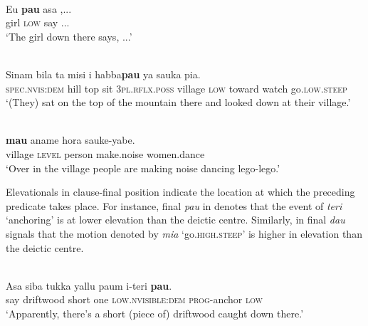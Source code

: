 \ea%
\label{ex:7:33}
 \\
\gll   Eu  \textbf{pau} asa{\ng} ,...\\
   girl  \textsc{low} say ... \\
\glt   `The girl down there says, ...' 
\z









\ea%
\label{ex:7:34}
 \\
\gll  Sinam   bila    ta{\ng}    misi{\ng}  i  habba{\ng}\textbf{pau}   ya     sauka{\ng}  pia. \\
    \textsc{spec.nvis:dem} hill  top  sit  \textsc{3pl.rflx.poss} village  \textsc{low}   toward  watch  go\textsc{.low.steep} \\
\glt   `(They) sat on the top of the mountain there and looked down at their village.'
\z

\ea%
\label{ex:7:35}
 \\
 \textbf{mau} {aname  hora{\ng}}  sauke-yabe.\\
  village  \textsc{level} person  make.noise  women.dance \\
\glt  `Over in the village people are making noise dancing lego-lego.' 
\z


Elevationals in clause-final position indicate the location at which the preceding predicate takes place. For instance, final \textit{pau} in  denotes that the event of \textit{teri} `anchoring' is at lower elevation than the deictic centre. Similarly, in  final \textit{dau} signals that the motion denoted by \textit{mia} `go.\textsc{high.steep}' is higher in elevation than the deictic centre. 



\ea%
\label{ex:7:36}
 \\
\gll  Asa{\ng}  siba{\ng}  tukka  yallu  paum  i-teri \textbf{pau}.\\
  say  driftwood  short  one  \textsc{low.nvisible:dem} \textsc{prog}{}-anchor  \textsc{low} \\
\glt  `Apparently, there's a short (piece of) driftwood caught down there.'
\z
     

